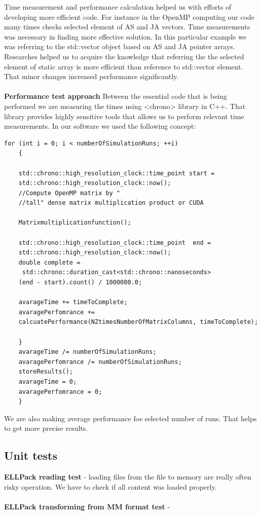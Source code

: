 \documentclass{scrreprt}
\begin{document}
Time measurement and performance calculation helped us with efforts of developing more efficient code.
For instance in the OpenMP computing our code  many times checks selected element of AS and JA vectors. Time measurements was necessary in finding more effective solution. In this particular example we was referring to the std::vector object based on AS and JA pointer arrays. Researches helped us to acquire the knowledge that referring the the selected element of static array is more efficient than reference to std::vector element. That minor changes increased performance significantly. 
\\
\\
\textbf{Performance test approach}
Between the essential code that is being performed we are measuring the times using <chrono> library in C++. That library provides highly sensitive tools that allows us to perform relevant time measurements. In our software we used the following concept:
\\
\begin{lstlisting}
for (int i = 0; i < numberOfSimulationRuns; ++i)
	{

	std::chrono::high_resolution_clock::time_point start = 
	std::chrono::high_resolution_clock::now();
	//Compute OpenMP matrix by "
	//tall" dense matrix multiplication product or CUDA
			
	Matrixmultiplicationfunction();

	std::chrono::high_resolution_clock::time_point  end = 
	std::chrono::high_resolution_clock::now();
	double complete =
	 std::chrono::duration_cast<std::chrono::nanoseconds>
	(end - start).count() / 1000000.0;

	avarageTime += timeToComplete;
	avaragePerfomrance += 
	calcuatePerformance(NZtimesNumberOfMatrixColumns, timeToComplete);	
			
	}
	avarageTime /= numberOfSimulationRuns;
	avaragePerfomrance /= numberOfSimulationRuns;
	storeResults();
	avarageTime = 0;
	avaragePerfomrance = 0;
	}

\end{lstlisting}


We are also making average performance foe selected number of runs. That helps to get more precise results.


\subsection{Unit tests}

\textbf{ELLPack reading test} - loading files from the file to memory are really often risky operation. We have to check if all content was loaded properly. 
\\
\\
\textbf{ELLPack transforming from MM format test} - 
\end{document}
